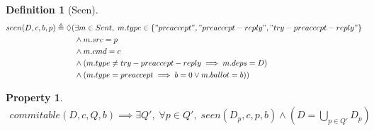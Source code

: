 \documentclass[a4paper]{article}
\theoremstyle{definition}
\newtheorem{definition}{Definition}
\theoremstyle{plain}
\newtheorem{property}{Property}
\begin{document}
\begin{definition}[Seen]
\begin{align*}
    seen(D,c,b,p) \triangleq \lozenge(& \exists m \in Sent, \; m.type \in \{"preaccept", "preaccept-reply", "try-preaccept-reply"\} \\
                                    &\wedge m.src = p \\
                                    &\wedge m.cmd = c \\
                                    &\wedge (m.type \neq try-preaccept-reply \implies m.deps = D) \\
                                    &\wedge (m.type = preaccept \implies b = 0 \vee m.ballot = b))
\end{align*}
\end{definition}

\begin{property}
    \begin{align*}
    commitable(D,c,Q,b) \implies \exists Q', \; \forall p \in Q', \; seen(D_p,c,p,b) \wedge (D = \bigcup_{p \in Q'}{D_p})
    \end{align*}
\end{property}
\end{document}
